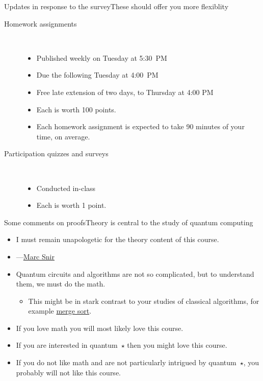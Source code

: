\begin{frame}{Updates in response to the survey}{These should offer you more flexiblity}

\begin{description}
\item[Homework assignments] \ %
\begin{itemize}
    \item Published weekly on Tuesday at 5:30~PM
    \item Due the following Tuesday at 4:00~PM
    \item Free late extension of two days, to Thursday at 4:00 PM
    \item Each is worth 100 points.
    \item Each homework assignment is expected to take 90 minutes of your time, on average.
\end{itemize}
\item[Participation quizzes and surveys]\ %
\begin{itemize}
    \item Conducted in-class
    \item Each is worth 1 point.
\end{itemize}
\end{description}
    
\end{frame}

\begin{frame}{Some comments on proofs}{Theory is central to the study of quantum computing}

\begin{itemize}
    \item I must remain unapologetic for the theory content of this course.
    \item {}---\href{https://snir.cs.illinois.edu/}{Marc Snir}
    \item Quantum circuits and algorithms are not so complicated, but to understand them, we must do the math.
    \begin{itemize}
        \item This might be in stark contrast to your studies of classical algorithms, for example \href{https://en.wikipedia.org/wiki/Merge_sort}{merge sort}.
    \end{itemize}
    \item If you love math you will most likely love this course.
    \item If you are interested in quantum~$\star$ then you might love this course.
    \item If you do not like math and are not particularly intrigued by quantum~$\star$, you probably will not like this course. 
\end{itemize}
    
\end{frame}

